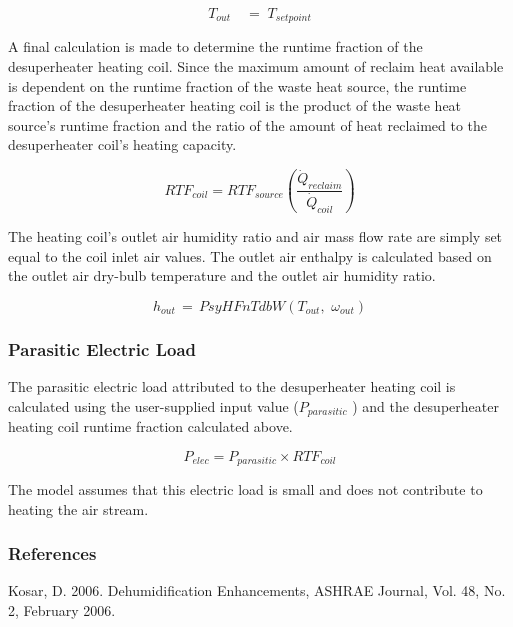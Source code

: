 \begin{equation}
{T_{out}}\quad  = \;{T_{setpoint}}
\end{equation}

A final calculation is made to determine the runtime fraction of the desuperheater heating coil. Since the maximum amount of reclaim heat available is dependent on the runtime fraction of the waste heat source, the runtime fraction of the desuperheater heating coil is the product of the waste heat source's runtime fraction and the ratio of the amount of heat reclaimed to the desuperheater coil's heating capacity.

\begin{equation}
RT{F_{coil}} = RT{F_{source}}\left( {\frac{{{{\dot Q}_{reclaim}}}}{{{{\dot Q}_{coil}}}}} \right)
\end{equation}

The heating coil's outlet air humidity ratio and air mass flow rate are simply set equal to the coil inlet air values. The outlet air enthalpy is calculated based on the outlet air dry-bulb temperature and the outlet air humidity ratio.

\begin{equation}
{h_{out}}\, = \,PsyHFnTdbW({T_{out}},\,\,{\omega_{out}})
\end{equation}

\subsubsection{Parasitic Electric Load}\label{parasitic-electric-load}

The parasitic electric load attributed to the desuperheater heating coil is calculated using the user-supplied input value (\({P_{parasitic}}\) ) and the desuperheater heating coil runtime fraction calculated above.

\begin{equation}
{P_{elec}} = {P_{parasitic}} \times RT{F_{coil}}
\end{equation}

The model assumes that this electric load is small and does not contribute to heating the air stream.

\subsubsection{References}\label{references-7}

Kosar, D. 2006. Dehumidification Enhancements, ASHRAE Journal, Vol. 48, No. 2, February 2006.

